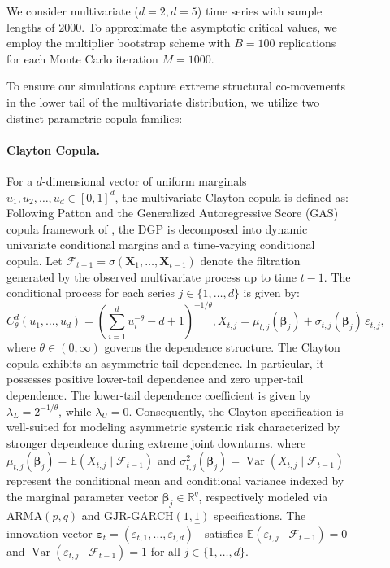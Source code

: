 \documentclass[10pt, a4paper]{article}
\theoremstyle{assumption}
\theoremstyle{definition}
\theoremstyle{theorem}
\begin{document}
\begin{figure}
We consider multivariate ($d=2, d=5$) time series with sample lengths of $2000$. To approximate the asymptotic critical values, we employ the multiplier bootstrap scheme with $B = 100$ replications for each Monte Carlo iteration $M=1000$. 

To ensure our simulations capture extreme structural co-movements in the lower tail of the multivariate distribution, we utilize two distinct parametric copula families:

\paragraph{ Clayton Copula.} For a $d$-dimensional vector of uniform marginals $u_1, u_2, \dots, u_d \in [0, 1]^d$, the multivariate Clayton copula is defined as:
Following Patton \citep{Patton2006} and the Generalized Autoregressive Score (GAS) copula framework of \cite{DeLira2015}, the DGP is decomposed into dynamic univariate conditional margins and a time-varying conditional copula. Let $\mathcal{F}_{t-1} = \sigma(\boldsymbol{X}_1, \dots, \boldsymbol{X}_{t-1})$ denote the filtration generated by the observed multivariate process up to time $t-1$. The conditional process for each series $j \in \{1, \dots, d\}$ is given by:
\begin{equation}
    C_\theta^d(u_1, \dots, u_d) = \left( \sum_{i=1}^d u_i^{-\theta} - d + 1 \right)^{-1/\theta},
    \label{eq : Clayton}
    X_{t,j} = \mu_{t,j}(\boldsymbol{\beta}_j) + \sigma_{t,j}(\boldsymbol{\beta}_j)\,\varepsilon_{t,j},
\end{equation}
where $ \theta \in (0, \infty)$ governs the dependence  structure.
The Clayton copula exhibits an asymmetric tail dependence. In particular, it possesses positive lower-tail dependence and zero upper-tail dependence. The lower-tail dependence coefficient is given by $\lambda_L = 2^{-1/\theta}$, while  $\lambda_U = 0$. Consequently, the Clayton specification is well-suited for modeling asymmetric systemic risk characterized by stronger dependence during extreme joint downturns.
where $\mu_{t,j}(\boldsymbol{\beta}_j) = \mathbb{E}(X_{t,j} \mid \mathcal{F}_{t-1})$ and $\sigma_{t,j}^2(\boldsymbol{\beta}_j) = \operatorname{Var}(X_{t,j} \mid \mathcal{F}_{t-1})$ represent the conditional mean and conditional variance indexed by the marginal parameter vector $\boldsymbol{\beta}_j \in \mathbb{R}^q$, respectively modeled via $\text{ARMA}(p, q)$ and $\text{GJR-GARCH}(1, 1)$ specifications. The innovation vector $\boldsymbol{\varepsilon}_t = (\varepsilon_{t,1}, \dots, \varepsilon_{t,d})^\top$ satisfies $\mathbb{E}(\varepsilon_{t,j} \mid \mathcal{F}_{t-1}) = 0$ and $\operatorname{Var}(\varepsilon_{t,j} \mid \mathcal{F}_{t-1}) = 1$ for all $j \in \{1, \dots, d\}$.


\end{figure}
\end{document}
